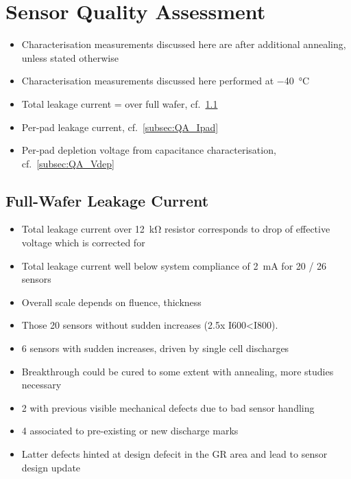 \section{Sensor Quality Assessment}
\label{sec:QA}

\begin{itemize}
	\item Characterisation measurements discussed here are after additional annealing, unless stated otherwise 
	\item Characterisation measurements discussed here performed at \SI{-40}{\celsius}
	\item Total leakage current = over full wafer, cf.~\ref{subsec:QA_Itot}
	\item Per-pad leakage current, cf.~\ref{subsec:QA_Ipad} 
	\item Per-pad depletion voltage from capacitance characterisation, cf.~\ref{subsec:QA_Vdep}
\end{itemize}

\subsection{Full-Wafer Leakage Current}
\label{subsec:QA_Itot}

\begin{itemize}
	\item Total leakage current over \SI{12}{\kilo\ohm} resistor corresponds to drop of effective voltage which is corrected for
	\item Total leakage current well below system compliance of \SI{2}{\milli\ampere} for 20 / 26 sensors
	\item Overall scale depends on fluence, thickness
	\item Those 20 sensors without sudden increases (2.5x I600<I800).
	\item 6 sensors with sudden increases, driven by single cell discharges
	\item Breakthrough could be cured to some extent with annealing, more studies necessary
	\item 2 with previous visible mechanical defects due to bad sensor handling
	\item 4 associated to pre-existing or new discharge marks
	\item Latter defects hinted at design defecit in the GR area and lead to sensor design update
\end{itemize}

